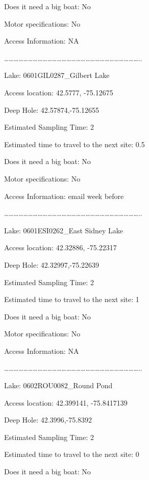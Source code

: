 \documentclass[]{article}
\begin{document}
Does it need a big boat: No

Motor specifications: No

Access Information: NA

\ldots{}\ldots{}\ldots{}\ldots{}\ldots{}\ldots{}\ldots{}\ldots{}\ldots{}\ldots{}\ldots{}\ldots{}\ldots{}\ldots{}\ldots{}\ldots{}\ldots{}\ldots{}\ldots{}\ldots{}\ldots{}\ldots{}\ldots{}\ldots{}\ldots{}\ldots{}\ldots{}\ldots{}..

Lake: 0601GIL0287\_Gilbert Lake

Access location: 42.5777, -75.12675

Deep Hole: 42.57874,-75.12655

Estimated Sampling Time: 2

Estimated time to travel to the next site: 0.5

Does it need a big boat: No

Motor specifications: No

Access Information: email week before

\ldots{}\ldots{}\ldots{}\ldots{}\ldots{}\ldots{}\ldots{}\ldots{}\ldots{}\ldots{}\ldots{}\ldots{}\ldots{}\ldots{}\ldots{}\ldots{}\ldots{}\ldots{}\ldots{}\ldots{}\ldots{}\ldots{}\ldots{}\ldots{}\ldots{}\ldots{}\ldots{}\ldots{}..

Lake: 0601ESI0262\_East Sidney Lake

Access location: 42.32886, -75.22317

Deep Hole: 42.32997,-75.22639

Estimated Sampling Time: 2

Estimated time to travel to the next site: 1

Does it need a big boat: No

Motor specifications: No

Access Information: NA

\ldots{}\ldots{}\ldots{}\ldots{}\ldots{}\ldots{}\ldots{}\ldots{}\ldots{}\ldots{}\ldots{}\ldots{}\ldots{}\ldots{}\ldots{}\ldots{}\ldots{}\ldots{}\ldots{}\ldots{}\ldots{}\ldots{}\ldots{}\ldots{}\ldots{}\ldots{}\ldots{}\ldots{}..

Lake: 0602ROU0082\_Round Pond

Access location: 42.399141, -75.8417139

Deep Hole: 42.3996,-75.8392

Estimated Sampling Time: 2

Estimated time to travel to the next site: 0

Does it need a big boat: No
\end{document}
